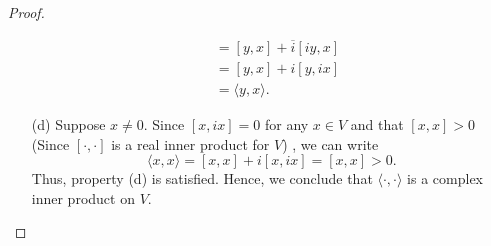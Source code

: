 \begin{proof}
\begin{enumerate}
\begin{align*}
                                                 &= [y,x] + \overline{i} [iy,x] \\
                                                 &= [y,x] + i[y,ix] \\
                                                 &= \langle y , x \rangle.
            \end{align*}
        \item[(d)] Suppose \( x \neq 0  \). Since \( [x,ix] = 0  \) for any \( x \in V  \) and that \( [x,x] > 0  \) (Since \( [\cdot,\cdot]   \) is a real inner product for \( V  \)) , we can write
            \[   \langle x , x \rangle = [x,x] + i[x,ix] = [x,x] > 0.  \]
           Thus, property (d) is satisfied. Hence, we conclude that \( \langle \cdot ,  \cdot \rangle  \) is a complex inner product on \( V  \). 
    \end{enumerate}
\end{proof} 
